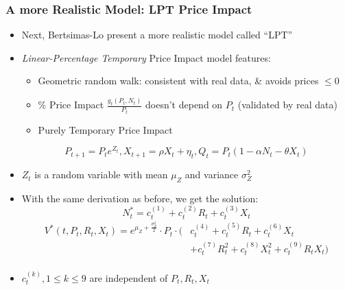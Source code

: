 \documentclass[handout]{beamer}
\begin{document}
\begin{frame}
\frametitle{A more Realistic Model: LPT Price Impact}
\pause
\begin{itemize}[<+->]
\item Next, Bertsimas-Lo present a more realistic model called ``LPT''
\item {\em Linear-Percentage Temporary} Price Impact model features:
\begin{itemize}
\item Geometric random walk: consistent with real data, \& avoids prices $\leq 0$
\item \% Price Impact $\frac {g_t(P_t,N_t)} {P_t}$ doesn't depend on $P_t$ (validated by real data)
\item Purely Temporary Price Impact
\end{itemize}
$$P_{t+1} = P_t e^{Z_t},  X_{t+1} = \rho X_t + \eta_t, Q_t = P_t(1 - \alpha N_t - \theta X_t)$$
\item $Z_t$ is a random variable with mean $\mu_Z$ and variance $\sigma^2_Z$
\item With the same derivation as before, we get the solution:
$$N_t^* = c^{(1)}_t + c^{(2)}_t R_t + c^{(3)}_t X_t $$
\begin{align*}
V^*(t,P_t,R_t,X_t) = e^{\mu_Z + \frac {\sigma_Z^2} 2} \cdot P_t \cdot ( & c^{(4)}_t + c^{(5)}_t R_t + c^{(6)}_t X_t \\
& + c^{(7)}_t R_t^2 + c^{(8)}_t X_t^2 + c^{(9)}_t R_t X_t)\\
\end{align*}
\item $c^{(k)}_t, 1 \leq k \leq 9$ are independent of $P_t, R_t, X_t$
\end{itemize}
\end{frame}
\end{document}
